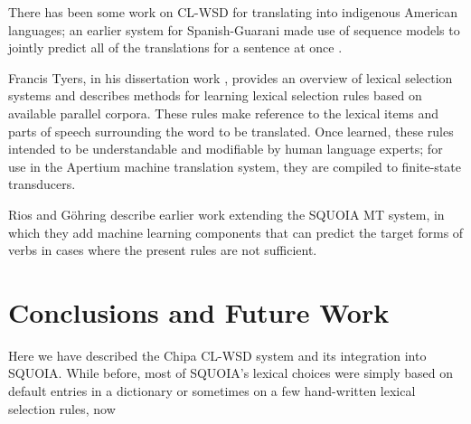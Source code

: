 \documentclass[10pt, a4paper]{article}
\begin{document}
There has been some work on CL-WSD for translating into indigenous American
languages; an earlier system for Spanish-Guarani made use of sequence models to
jointly predict all of the translations for a sentence at once
\cite{rudnick-gasser:2013:HyTra}.

Francis Tyers, in his dissertation work \cite{tyers-dissertation}, provides an
overview of lexical selection systems and describes methods for learning
lexical selection rules based on available parallel corpora. These rules make
reference to the lexical items and parts of speech surrounding the word to be
translated. Once learned, these rules intended to be understandable and
modifiable by human language experts; for use in the Apertium machine
translation system, they are compiled to finite-state transducers.

Rios and G\"{o}hring  describe
earlier work extending the SQUOIA MT system, in which they add machine learning
components that can predict the target forms of verbs in cases where the
present rules are not sufficient.

\section{Conclusions and Future Work}
Here we have described the Chipa CL-WSD system and its integration into SQUOIA.
While before, most of SQUOIA's lexical choices were simply based on default
entries in a dictionary or sometimes on a few hand-written lexical selection
rules, now 




\end{document}
